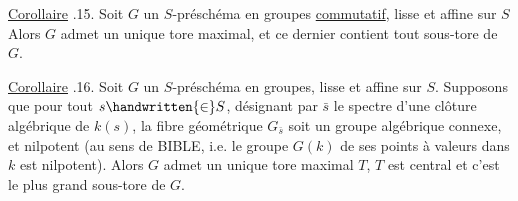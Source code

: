 \uline{Corollaire} .15. Soit $G$ un $S$-préschéma en groupes  \uline{commutatif}, lisse et affine sur $S$\handwritten{,}  Alors $G$ admet un unique tore maximal, et ce  dernier contient tout sous-tore de $G$.

\uline{Corollaire} .16. Soit $G$ un $S$-préschéma en groupes, lisse et affine sur $S$. Supposons que pour tout $s\handwritten{\in}S$, désignant par $\bar s$ le spectre d'une clôture algébrique  de $k(s)$, la fibre géométrique $G_{\bar s}$ soit un groupe algébrique connexe, et nilpotent (au sens de BIBLE, i.e. le groupe $G(k)$ de ses points à valeurs dans $k$ est nilpotent).  Alors $G$ admet un unique tore maximal $T$,  $T$ est central et c'est le plus grand sous-tore de $G$.

